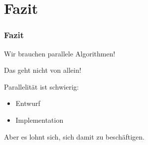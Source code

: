 \section{Fazit}

\begin{frame}
    \frametitle{Fazit}
    Wir brauchen parallele Algorithmen!

    Das geht nicht von allein!

    Parallelität ist schwierig:
    \begin{itemize}
        \item Entwurf
        \item Implementation
    \end{itemize}


    Aber es lohnt sich, sich damit zu beschäftigen.
\end{frame}
